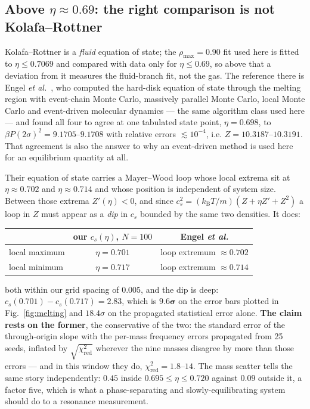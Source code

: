 \documentclass[journal]{IEEEtran}
\newcommand{\kT}{k_{\mathrm B}T}
\begin{document}
\subsection{Above $\eta \approx 0.69$: the right comparison is not Kolafa--Rottner}
\label{sec:ordering}
Kolafa--Rottner is a \emph{fluid} equation of state; the $\rho_{\max} = 0.90$ fit used here is fitted to
$\eta \le 0.7069$ and compared with data only for $\eta \le 0.69$, so above that a deviation from it measures
the fluid-branch fit, not the gas. The reference there is
Engel \emph{et al.}~\cite{engel2013}, who computed the hard-disk equation of state through the
melting region with event-chain Monte Carlo, massively parallel Monte Carlo, local Monte Carlo and
event-driven molecular dynamics --- the same algorithm class used here --- and found all four to
agree at one tabulated state point, $\eta = 0.698$, to $\beta P (2\sigma)^2 = 9.1705$--$9.1708$
with relative errors $\lesssim 10^{-4}$, i.e. $Z = 10.3187$--$10.3191$. That agreement is also the
answer to why an event-driven method is used here for an equilibrium quantity at all.

Their equation of state carries a Mayer--Wood loop whose local extrema sit at $\eta \approx 0.702$
and $\eta \approx 0.714$ and whose position is independent of system size. Between those extrema
$Z'(\eta) < 0$, and since $c_s^2 = (\kT/m)(Z + \eta Z' + Z^2)$ a loop in $Z$ must appear as a
\emph{dip} in $c_s$ bounded by the same two densities. It does:

\begin{center}\begin{tabular}{lcc}
\toprule
 & our $c_s(\eta)$, $N = 100$ & Engel \emph{et al.} \\
\midrule
local maximum & $\eta = 0.701$ & loop extremum $\approx 0.702$ \\
local minimum & $\eta = 0.717$ & loop extremum $\approx 0.714$ \\
\bottomrule
\end{tabular}\end{center}

\noindent both within our grid spacing of $0.005$, and the dip is deep:
$c_s(0.701) - c_s(0.717) = 2.83$, which is $\mathbf{9.6\sigma}$ on the error bars plotted in
Fig.~\ref{fig:melting} and $18.4\sigma$ on the propagated statistical error alone. \textbf{The
claim rests on the former}, the conservative of the two: the standard error of the through-origin
slope with the per-mass frequency errors propagated from 25 seeds, inflated by
$\sqrt{\chi^2_{\mathrm{red}}}$ wherever the nine masses disagree by more than those errors --- and
in this window they do, $\chi^2_{\mathrm{red}} = 1.8$--$14$. The mass scatter tells the same story
independently: $0.45$ inside $0.695 \le \eta \le 0.720$ against $0.09$ outside it, a factor five,
which is what a phase-separating and slowly-equilibrating system should do to a resonance
measurement.
\end{document}
